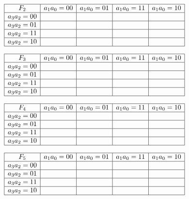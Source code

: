 \begin{center}
$\begin{array}{|c|c|c|c|c|}
\hline
F_2 & a_1a_0=00 & a_1a_0=01 & a_1a_0=11 & a_1a_0=10 \\
\hline
a_3a_2=00  &    &    &    &    \\
\hline
a_3a_2=01  &    &    &    &    \\
\hline
a_3a_2=11  &    &    &    &    \\
\hline
a_3a_2=10  &    &    &    &    \\
\hline
\end{array}$
\end{center}

\begin{center}
$\begin{array}{|c|c|c|c|c|}
\hline
F_3 & a_1a_0=00 & a_1a_0=01 & a_1a_0=11 & a_1a_0=10 \\
\hline
a_3a_2=00  &    &    &    &    \\
\hline
a_3a_2=01  &    &    &    &    \\
\hline
a_3a_2=11  &    &    &    &    \\
\hline
a_3a_2=10  &    &    &    &    \\
\hline
\end{array}$
\end{center}

\begin{center}
$\begin{array}{|c|c|c|c|c|}
\hline
F_4 & a_1a_0=00 & a_1a_0=01 & a_1a_0=11 & a_1a_0=10 \\
\hline
a_3a_2=00  &    &    &    &    \\
\hline
a_3a_2=01  &    &    &    &    \\
\hline
a_3a_2=11  &    &    &    &    \\
\hline
a_3a_2=10  &    &    &    &    \\
\hline
\end{array}$
\end{center}

\begin{center}
$\begin{array}{|c|c|c|c|c|}
\hline
F_5 & a_1a_0=00 & a_1a_0=01 & a_1a_0=11 & a_1a_0=10 \\
\hline
a_3a_2=00  &    &    &    &    \\
\hline
a_3a_2=01  &    &    &    &    \\
\hline
a_3a_2=11  &    &    &    &    \\
\hline
a_3a_2=10  &    &    &    &    \\
\hline
\end{array}$
\end{center}

